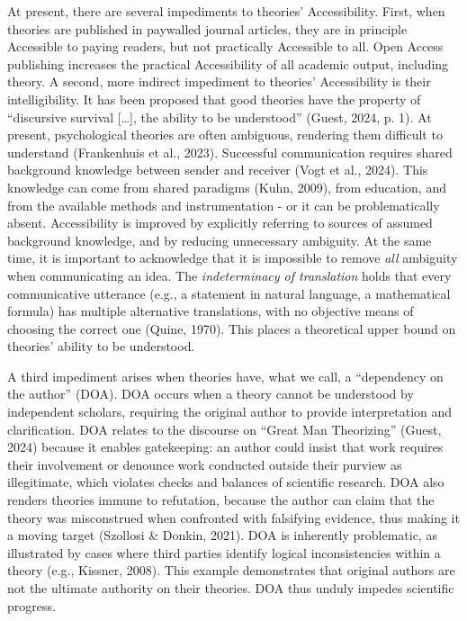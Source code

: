 \documentclass[
  man, noextraspace,floatsintext]{apa7}
\begin{document}
At present, there are several impediments to theories' Accessibility.
First, when theories are published in paywalled journal articles,
they are in principle Accessible to paying readers,
but not practically Accessible to all.
Open Access publishing increases the practical Accessibility of all academic output, including theory.
A second, more indirect impediment to theories' Accessibility is their intelligibility.
It has been proposed that good theories have the property of ``discursive survival {[}\ldots{]}, the ability to be understood'' (Guest, 2024, p. 1).
At present, psychological theories are often ambiguous, rendering them difficult to understand (Frankenhuis et al., 2023).
Successful communication requires shared background knowledge between sender and receiver (Vogt et al., 2024).
This knowledge can come from shared paradigms (Kuhn, 2009),
from education, and from the available methods and instrumentation - or it can be problematically absent.
Accessibility is improved by explicitly referring to sources of assumed background knowledge, and by reducing unnecessary ambiguity.
At the same time, it is important to acknowledge that it is impossible to remove \emph{all} ambiguity when communicating an idea.
The \emph{indeterminacy of translation} holds that every communicative utterance (e.g., a statement in natural language, a mathematical formula) has multiple alternative translations,
with no objective means of choosing the correct one (Quine, 1970).
This places a theoretical upper bound on theories' ability to be understood.

A third impediment arises when theories have, what we call, a ``dependency on the author'' (DOA).
DOA occurs when a theory cannot be understood by independent scholars,
requiring the original author to provide interpretation and clarification.
DOA relates to the discourse on ``Great Man Theorizing'' (Guest, 2024) because it enables gatekeeping: an author could insist that work requires their involvement or denounce work conducted outside their purview as illegitimate,
which violates checks and balances of scientific research.
DOA also renders theories immune to refutation,
because the author can claim that the theory was misconstrued when confronted with falsifying evidence, thus making it a moving target (Szollosi \& Donkin, 2021).
DOA is inherently problematic, as illustrated by cases where third parties identify logical inconsistencies within a theory (e.g., Kissner, 2008).
This example demonstrates that original authors are not the ultimate authority on their theories.
DOA thus unduly impedes scientific progress.
\end{document}
